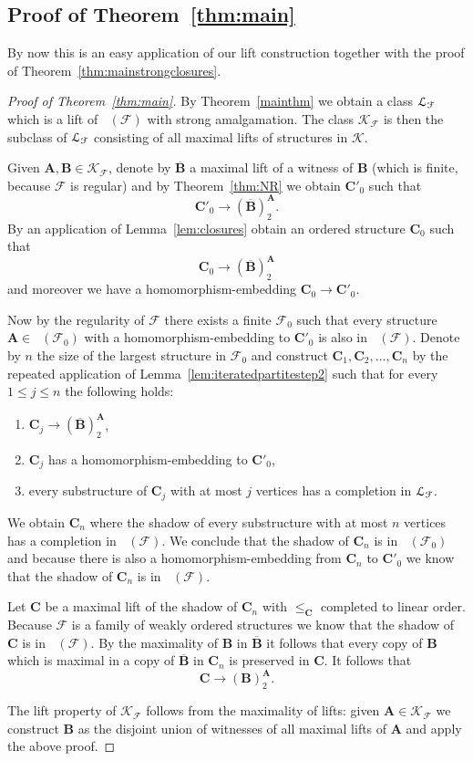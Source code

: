 \documentclass{elsarticle}
\def\Lifts{{\cal L}}
\def\Forb{\mathop{\mathrm{Forb_{he}}}\nolimits}
\def\str#1{\mathbf {#1}}
\def\F{{\mathcal F}}
\def\K{{\mathcal K}}
\theoremstyle{plain}
\theoremstyle{definition}
\theoremstyle{remark}
\begin{document}
\subsection{Proof of Theorem~\ref{thm:main}}
\label{sec:mainresult}
By now this is an easy application of our lift construction together with the proof of Theorem~\ref{thm:mainstrongclosures}.
\begin{proof}[Proof of Theorem~\ref{thm:main}]
By Theorem~\ref{mainthm} we obtain a class $\Lifts_\mathcal F$ which is a lift of $\Forb(\F)$ with strong amalgamation. 
The class $\K_\mathcal F$ is then the subclass of $\Lifts_\mathcal F$ consisting of all maximal
lifts of structures in $\K$.

Given $\str{A}, \str{B}\in \K_\mathcal{F}$, denote by $\overline{\str{B}}$ a maximal
lift of a witness of $\str{B}$ (which is finite, because $\F$ is regular) and by
Theorem~\ref{thm:NR} we obtain $\str{C}'_0$ such that
$$\str{C}'_0\longrightarrow(\overline{\str{B}})^{\str{A}}_2.$$
By an application of Lemma~\ref{lem:closures} obtain an ordered structure $\str{C}_0$ such that
$$\str{C}_0\longrightarrow(\overline{\str{B}})^{\str{A}}_2$$
and moreover we have  a homomorphism-embedding $\str{C}_0\to \str{C}'_0$.

Now by the regularity of $\F$ there exists a finite $\F_0$ such that every structure $\str{A}\in
\Forb(\F_0)$ with a homomorphism-embedding to $\str{C}'_0$ is also in
$\Forb(\F)$.  Denote by $n$ the size of the largest structure in $\F_0$ and
construct $\str{C}_1, \str{C}_2, \ldots, \str{C}_n$ by the repeated application of
Lemma~\ref{lem:iteratedpartitestep2} such that for every $1\leq j\leq n$ the following holds:
\begin{enumerate}
\item $\str{C}_j\longrightarrow (\overline{\str{B}})^{\str{A}}_2$, 
\item $\str{C}_j$ has a homomorphism-embedding to $\str{C}'_0$,
\item every substructure of $\str{C}_j$ with at most $j$ vertices has a completion in $\Lifts_\mathcal F$.
\end{enumerate}

We obtain  $\str{C}_n$ where the shadow of every substructure with at most $n$ vertices has a completion in $\Forb(\F)$.
We conclude that the shadow of $\str{C}_n$ is in $\Forb(\F_0)$ and because there is also a homomorphism-embedding
from $\str{C}_n$ to $\str{C}'_0$ we know that the shadow of $\str{C}_n$ is in $\Forb(\F)$. 

Let $\str{C}$ be a maximal lift of the shadow of $\str{C}_n$ with $\leq_\str{C}$ completed to linear order. Because $\F$ is a family of weakly ordered structures we know that the shadow of $\str{C}$ is in $\Forb(\F)$.
By the maximality of $\str{B}$ in $\overline{\str{B}}$ it follows that every copy of $\str{B}$ which is maximal in a copy of $\overline{\str{B}}$ in $\str{C}_n$ is preserved in $\str{C}$. It follows that
$$\str{C}\longrightarrow (\str{B})^\str{A}_2.$$

The lift property of $\mathcal K_\F$ follows from the maximality of lifts:
given $\str{A}\in \K_\mathcal F$ we construct $\str{B}$ as the disjoint union of witnesses
of all maximal lifts of $\str{A}$ and apply the above proof.
\end{proof}
\end{document}
